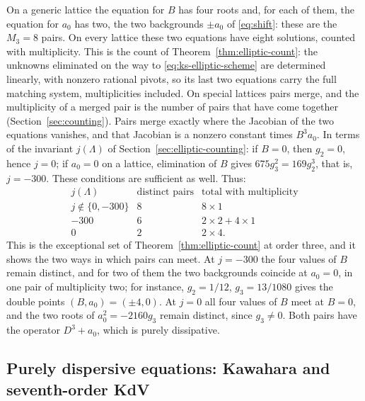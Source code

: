 On a generic lattice the equation for \(B\) has four roots and, for
each of them, the equation for \(a_0\) has two, the two backgrounds
\(\pm a_0\) of \eqref{eq:shift}: these are the \(M_3=8\) pairs. On
every lattice these two equations have eight solutions, counted with
multiplicity. This is the count of Theorem~\ref{thm:elliptic-count}:
the unknowns eliminated on the way to \eqref{eq:ks-elliptic-scheme} are
determined linearly, with nonzero rational pivots, so its last two
equations carry the full matching system, multiplicities included. On
special lattices pairs merge, and the multiplicity of a merged pair is
the number of pairs that have come together
(Section~\ref{sec:counting}). Pairs merge exactly where the Jacobian of
the two equations vanishes, and that Jacobian is a nonzero constant
times \(B^3a_0\). In terms of the invariant \(j(\Lambda)\) of
Section~\ref{sec:elliptic-counting}: if \(B=0\), then \(g_2=0\), hence
\(j=0\); if \(a_0=0\) on a lattice, elimination of \(B\) gives
\(675g_3^2=169g_2^3\), that is, \(j=-300\). These conditions are
sufficient as well. Thus:
\begin{equation}\label{eq:ks-collisions}
 \begin{array}{c|c|c}
 j(\Lambda)&\text{distinct pairs}&\text{total with multiplicity}\\ \hline
 j\notin\{0,-300\}&8&8\times1\\
 -300&6&2\times2+4\times1\\
 0&2&2\times4.
 \end{array}
\end{equation}
This is the exceptional set of Theorem~\ref{thm:elliptic-count} at
order three, and it shows the two ways in which pairs can meet. At
\(j=-300\) the four values of \(B\) remain distinct, and for two of
them the two backgrounds coincide at \(a_0=0\), in one pair of
multiplicity two; for instance, \(g_2=1/12\), \(g_3=13/1080\) gives the
double points \((B,a_0)=(\pm4,0)\). At \(j=0\) all four values of \(B\)
meet at \(B=0\), and the two roots of \(a_0^2=-2160g_3\) remain
distinct, since \(g_3\ne0\). Both pairs have the operator \(D^3+a_0\),
which is purely dissipative.

\subsection{Purely dispersive equations: Kawahara and seventh-order KdV}
\label{sec:kawahara}

